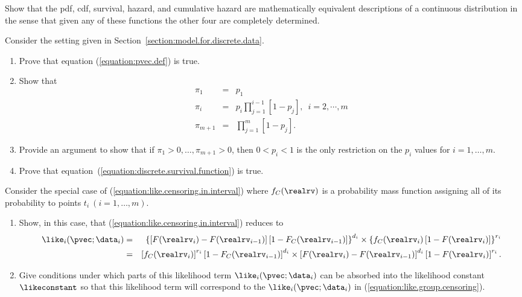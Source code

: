 \begin{exercise1}
Show that the pdf, cdf, survival, hazard, and cumulative hazard are
mathematically equivalent descriptions of a continuous distribution
in the sense that given any of these functions the other four are
completely determined.
\end{exercise1}


\begin{exercise1}
Consider the setting given in
Section~\ref{section:model.for.discrete.data}.  
\begin{enumerate}
\item 
Prove that equation (\ref{equation:pvec.def}) is true.
\item 
Show that
\begin{eqnarray*}
\pi_{1}&=&p_{1}  \\
\pi_{i}&=&p_{i} \prod_{j=1}^{i-1}\left [ 1 - p_{j} \right ], \,\,\, i=2, \cdots, m \\
\pi_{m+1}&=&\prod_{j=1}^{m}\left [ 1 - p_{j} \right ].
\end{eqnarray*}
\item 
Provide an argument to show that if
$\pi_{1} > 0, \ldots,\pi_{m+1} > 0$, then $0 < p_{i} < 1$
is the only restriction on the $p_{i}$ values for $i=1,\dots , m$.  
\item 
Prove that equation~(\ref{equation:discrete.survival.function}) is
true.
\end{enumerate}
\end{exercise1}



\begin{exercise1}
Consider the special case of (\ref{equation:like.censoring.in.interval})
where
$f_{C}(\realrv)$ is a probability mass function
assigning all of its probability to points $t_{i}~(i=1,\ldots,m)$.
\begin{enumerate}
\item
Show, in this case, that (\ref{equation:like.censoring.in.interval})
reduces to
\begin{eqnarray*}
\like_{i}(\pvec;\data_{i})&=&
\left \{ \left [
         F(\realrv_{i})-F(\realrv_{i-1})
	 \right ]
          \left [
	   1-F_{C}(\realrv_{i-1})
	  \right ] 
\right \}^{d_{i}}
\times 
 \left \{
   f_C(\realrv_{i}) \left [
	   1-F(\realrv_{i})
	  \right ]
\right \}^{r_{i}}
\\
&=&
\left [
   f_C(\realrv_{i}) 
\right ]^{r_{i}}
   \left [
	   1-F_{C}(\realrv_{i-1})
	  \right ] ^{d_{i}}
\times 
\left [ 
  F(\realrv_{i})-F(\realrv_{i-1})
\right ]^{d_{i}}
 \left [
	   1-F(\realrv_{i})
	  \right ]^{r_{i}}.
\end{eqnarray*}
\item
Give conditions under which parts of this likelihood term
$\like_{i}(\pvec;\data_{i})$ can be absorbed into the likelihood
constant $\likeconstant$ so that this likelihood term will correspond
to the $\like_{i}(\pvec;\data_{i})$ in
(\ref{equation:like.group.censoring}).
\end{enumerate}
\end{exercise1}

